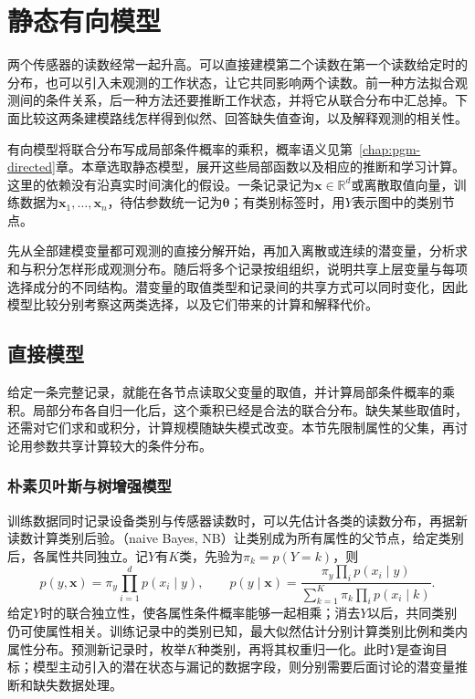 \chapter{静态有向模型}
\label{chap:pgm-static-directed}

两个传感器的读数经常一起升高。可以直接建模第二个读数在第一个读数给定时的分布，也可以引入未观测的工作状态，让它共同影响两个读数。前一种方法拟合观测间的条件关系，后一种方法还要推断工作状态，并将它从联合分布中汇总掉。下面比较这两条建模路线怎样得到似然、回答缺失值查询，以及解释观测的相关性。

有向模型将联合分布写成局部条件概率的乘积，概率语义见第~\ref{chap:pgm-directed}章。本章选取静态模型，展开这些局部函数以及相应的推断和学习计算。这里的依赖没有沿真实时间演化的假设。一条记录记为$\bm x\in\mathbb R^d$或离散取值向量，训练数据为$\bm x_1,\ldots,\bm x_n$，待估参数统一记为$\bm\theta$；有类别标签时，用$Y$表示图中的类别节点。

先从全部建模变量都可观测的直接分解开始，再加入离散或连续的潜变量，分析求和与积分怎样形成观测分布。随后将多个记录按组组织，说明共享上层变量与每项选择成分的不同结构。潜变量的取值类型和记录间的共享方式可以同时变化，因此模型比较分别考察这两类选择，以及它们带来的计算和解释代价。

\section{直接模型}
\label{sec:pgm-static-directed-direct}

给定一条完整记录，就能在各节点读取父变量的取值，并计算局部条件概率的乘积。局部分布各自归一化后，这个乘积已经是合法的联合分布。缺失某些取值时，还需对它们求和或积分，计算规模随缺失模式改变。本节先限制属性的父集，再讨论用参数共享计算较大的条件分布。

\subsection{朴素贝叶斯与树增强模型}
\label{sec:pgm-static-directed-naive-tan}

训练数据同时记录设备类别与传感器读数时，可以先估计各类的读数分布，再据新读数计算类别后验。（naive Bayes, NB）让类别成为所有属性的父节点，给定类别后，各属性共同独立。记$Y$有$K$类，先验为$\pi_k=p(Y=k)$，则
\begin{equation}
  \label{eq:pgm-static-directed-naive}
  p(y,\bm{x})=\pi_y\prod_{i=1}^{d}p(x_i\mid y),\qquad
  p(y\mid\bm{x})=
  \frac{\pi_y\prod_i p(x_i\mid y)}
       {\sum_{k=1}^{K}\pi_k\prod_i p(x_i\mid k)}.
\end{equation}
给定$Y$时的联合独立性，使各属性条件概率能够一起相乘；消去$Y$以后，共同类别仍可使属性相关。训练记录中的类别已知，最大似然估计分别计算类别比例和类内属性分布。预测新记录时，枚举$K$种类别，再将其权重归一化。此时$Y$是查询目标；模型主动引入的潜在状态与漏记的数据字段，则分别需要后面讨论的潜变量推断和缺失数据处理。

